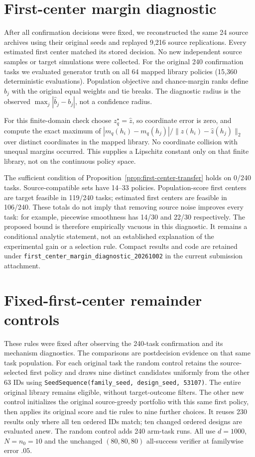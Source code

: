 \section{First-center margin diagnostic}

After all confirmation decisions were fixed, we reconstructed the same
24 source archives using their original seeds and replayed 9,216 source
replications.  Every estimated first center matched its stored decision.
No new independent source samples or target simulations were collected.
For the original 240 confirmation tasks we evaluated generator truth on
all 64 mapped library policies (15,360 deterministic evaluations).
Population objective and chance-margin ranks define $b_j$ with the original
equal weights and tie breaks.  The diagnostic radius is the observed
$\max_j|\widehat b_j-b_j|$, not a confidence radius.

For this finite-domain check choose $z_q^\star=\widehat z$, so coordinate
error is zero, and compute the exact maximum of
$|m_q(h_i)-m_q(h_j)|/\|\widehat z(h_i)-\widehat z(h_j)\|_2$
over distinct coordinates in the mapped library.  No coordinate collision
with unequal margins occurred.  This supplies a Lipschitz constant only on
that finite library, not on the continuous policy space.

The sufficient condition of Proposition~\ref{prop:first-center-transfer}
holds on 0/240 tasks.  Source-compatible sets have 14--33 policies.
Population-score first centers are target feasible in 119/240 tasks;
estimated first centers are feasible in 106/240.  These totals do not imply
that removing source noise improves every task: for example, piecewise
smoothness has 14/30 and 22/30 respectively.  The proposed bound is therefore
empirically vacuous in this diagnostic.  It remains a conditional analytic
statement, not an established explanation of the experimental gain or a
selection rule.  Compact results and code are retained under
\texttt{first\_center\_margin\_diagnostic\_20261002} in the current
submission attachment.


\section{Fixed-first-center remainder controls}\label{ec:remainder-controls}

These rules were fixed after observing the 240-task confirmation and its
mechanism diagnostics.  The comparisons are postdecision evidence on that
same task population.  For each original task the random control retains the
source-selected first policy and draws nine distinct candidates uniformly
from the other 63 IDs using
\texttt{SeedSequence(family\_seed, design\_seed, 53107)}.
The entire original library remains eligible, without target-outcome filters.
The other new control initializes the original source-greedy portfolio with
this same first policy, then applies its original score and tie rules to nine
further choices.  It reuses 230 results only where all ten ordered IDs match;
ten changed ordered designs are evaluated anew.  The random control adds
240 arm-task runs.  All use $d=1000$, $N=n_0=10$ and the unchanged
$(80,80,80)$ all-success verifier at familywise error $.05$.

